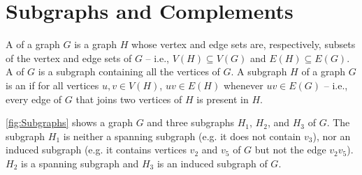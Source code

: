 \section{Subgraphs and Complements}\label{sec:Subgraphs}

A  of a graph $G$ is a graph $H$ whose vertex and edge sets are, respectively, subsets of the vertex and edge sets of $G$ -- i.e., $V(H) \subseteq V(G)$ and $E(H) \subseteq E(G)$. A  of $G$ is a subgraph containing all the vertices of $G$. A subgraph $H$ of a graph $G$ is an  if for all vertices $u, v \in V(H)$, $uv \in E(H)$ whenever $uv \in E(G)$ -- i.e., every edge of $G$ that joins two vertices of $H$ is present in $H$.

\begin{Example}\label{ex:Subgraphs}
\cref{fig:Subgraphs} shows a graph $G$ and three subgraphs $H_1$, $H_2$, and $H_3$ of $G$. The subgraph $H_1$ is neither a spanning subgraph (e.g. it does not contain $v_3$), nor an induced subgraph (e.g. it contains vertices $v_2$ and $v_5$ of $G$ but not the edge $v_2 v_5$). $H_2$ is a spanning subgraph and $H_3$ is an induced subgraph of $G$.
\begin{figure}[!htbp]
\centering
{} \hfill

\end{figure}
\end{Example}
